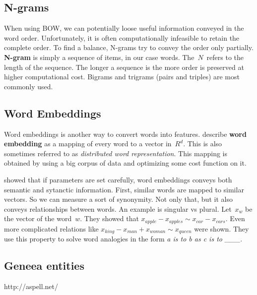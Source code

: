 


\subsection{N-grams}

When using BOW, we can potentially loose useful information conveyed in the word order.
Unfortunately, it is often computationally infeasible to retain the complete order.
To find a balance, N-grams try to convey the order only partially.
\textbf{N-gram} is simply a sequence of items, in our case words. The~$N$~refers to the length of the sequence.
The longer a sequence is the more order is preserved at higher computational cost.
Bigrams and trigrams (pairs and triples) are most commonly used.


\subsection{Word Embeddings}
\label{subsec:wordembed}

Word embeddings is another way to convert words into features.
\citet{LeGo14} describe {\bf word embedding} as a mapping of every word to a vector in~$R^d$.
This is also sometimes referred to as \textit{distributed word representation}.
This mapping is obtained by using a big corpus of data and optimizing some cost function on it.

\citet{Mik13} showed that if parameters are set carefully, word embeddings conveys both semantic and sytanctic information.
First, similar words are mapped to similar vectors. So we can measure a sort of synonymity.
Not only that, but it also conveys relationships between words.
An example is singular vs plural.
Let~$x_{w}$ be the vector of the word~$w$.
They showed that $x_{apple}-x_{apples} \sim x_{car}-x_{cars}$.
Even more complicated relations like $x_{king} - x_{man} + x_{woman} \sim x_{queen}$ were shown.
They use this property to solve word analogies in the form {\it a is to b as c is to \_\_\_}.


\subsection{Geneea entities}http://aspell.net/

